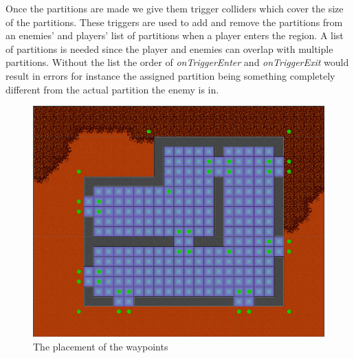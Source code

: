 Once the partitions are made we give them trigger colliders which cover the size of the partitions.
These triggers are used to add and remove the partitions from an enemies' and players' list of partitions when a player enters the region.
A list of partitions is needed since the player and enemies can overlap with multiple partitions.
Without the list the order of \textit{onTriggerEnter} and \textit{onTriggerExit} would result in errors for instance the assigned partition being something completely different from the actual partition the enemy is in.


\begin{figure}[H]
	\includegraphics[width=\textwidth]{figures/astar/waypoints}
	\caption{The placement of the waypoints}
	\label{waypointsNode}
\end{figure}

